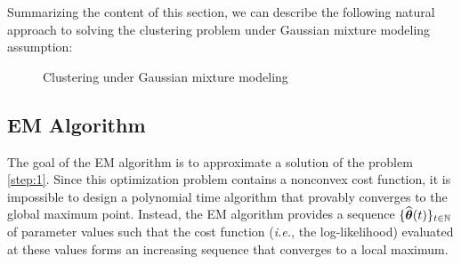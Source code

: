 Summarizing the content of this section, we can describe the following  natural approach to solving the clustering problem under Gaussian
mixture modeling assumption:
\begin{figure}[h]
\begin{center}
   \caption{Clustering under Gaussian mixture modeling}
   \label{algo:general}
\end{center}
\vspace{-15pt}
\end{figure}


\subsection{EM Algorithm}

The goal of the EM algorithm is to approximate a solution of the problem \eqref{step:1}.
Since this optimization problem contains a nonconvex cost function, it is impossible to
design a polynomial time algorithm that provably converges to the global maximum point. Instead,
the EM algorithm provides a sequence $\{\widehat{{\boldsymbol\theta}}(t)\}_{t\in{\mathbb N}}$ of parameter values such that
the cost function (\textit{i.e.}, the log-likelihood) evaluated at these values forms an
increasing sequence that converges to a local maximum.

